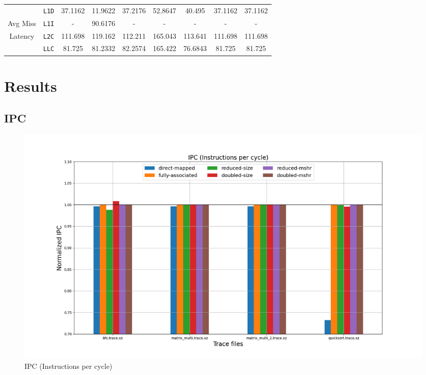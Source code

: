 \documentclass[11pt, swedish, openany]{book}
\begin{document}
\begin{table}[H]
\begin{tabular}{||c|c||c||c|c||c|c||c|c||}
        \hline
                                            & \texttt{L1D} & 37.1162                   & 11.9622  & 37.2176     & 52.8647  & 40.495   & 37.1162  & 37.1162  \\
        Avg Miss                            & \texttt{L1I} & -                         & 90.6176  & -           & -        & -        & -        & -        \\
        Latency                             & \texttt{L2C} & 111.698                   & 119.162  & 112.211     & 165.043  & 113.641  & 111.698  & 111.698  \\
                                            & \texttt{LLC} & 81.725                    & 81.2332  & 82.2574     & 165.422  & 76.6843  & 81.725   & 81.725   \\
        \hline
    \end{tabular}
\end{table}


\section{Results}
\subsection{IPC}
\begin{figure}[H]
    \centering
    \includegraphics[scale=0.4]{champsim/speedup.png}
    \caption{IPC (Instructions per cycle)}
\end{figure}
\end{document}
